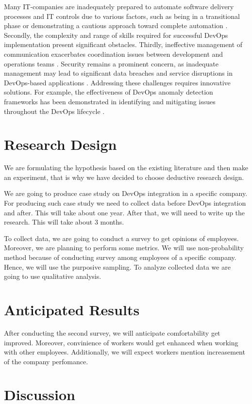 \documentclass[oneside,final,12pt,a4paper]{extreport}
\begin{document}
Many IT-companies are inadequately prepared to automate software delivery processes and IT controls due to various factors, such as being in a transitional phase or demonstrating a cautious approach toward complete automation \cite{12}. Secondly, the complexity and range of skills required for successful DevOps implementation present significant obstacles. Thirdly, ineffective management of communication exacerbates coordination issues between development and operations teams \cite{7}. Security remains a prominent concern, as inadequate management may lead to significant data breaches and service disruptions in DevOps-based applications \cite{14}. Addressing these challenges requires innovative solutions. For example, the effectiveness of DevOps anomaly detection frameworks has been demonstrated in identifying and mitigating issues throughout the DevOps lifecycle \cite{13}.

\section{Research Design}

We are formulating the hypothesis based on the existing literature and then make an experiment, that is why we have decided to choose deductive research design.

We are going to produce case study on DevOps integration in a specific company. For producing such case study we need to collect data before DevOps integration and after. This will take about one year. After that, we will need to write up the research. This will take about 3 months.


To collect data, we are going to conduct a survey to get opinions of employees. Moreover, we are planning to perform some metrics. We will use non-probability method because of conducting survey among employees of a specific company. Hence, we will use the purposive sampling. To analyze collected data we are going to use qualitative analysis.

\section{Anticipated Results}


After conducting the second survey, we will anticipate comfortability get improved. Moreover, convinience of workers would get enhanced when working with other employees. Additionally, we will expect workers mention increasement of the company perfomance.

\section{Discussion}



\newpage
\printbibliography[heading=bibintoc,title={References}]
\end{document}

